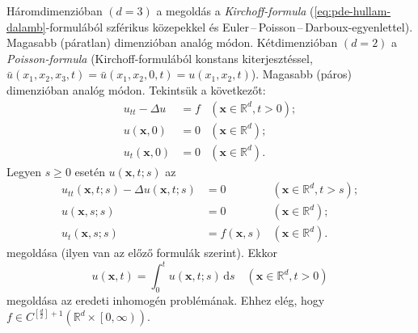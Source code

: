 \documentclass[%
	DIV=15,appendixprefix]{scrreprt}
\theoremstyle{definition}
\theoremstyle{remark}
\begin{document}
Háromdimenzióban $ \left( d = 3 \right) $ a megoldás a \emph{Kirchoff-formula}
(\ref{eq:pde-hullam-dalamb}-formulából szférikus közepekkel és
Euler\,--\,Poisson\,--\,Darboux-egyenlettel). Magasabb (páratlan) dimenzióban analóg módon.
%
Kétdimenzióban $ \left( d = 2 \right) $ a \emph{Poisson-formula} (Kirchoff-formulából konstans
kiterjesztéssel, $ \bar{u} \left( x_{ 1 },{} x_{ 2 },{} x_{ 3 },{} t \right) = \bar{u} \left(
x_{ 1 },{} x_{ 2 },{} 0,{} t \right) = u \left( x_{ 1 },{} x_{ 2 },{} t \right) $). Magasabb (páros) dimenzióban analóg módon.
%
Tekintsük a következőt:
\begin{equation*}
	\begin{aligned}
		u_{ tt } - \Delta u 						&= f 	&
			\left( \mathbf{ x } \in \mathbb{ R }^{ d },{} t > 0 \right);\\
		u \left( \mathbf{ x },{} 0 \right) 			&= 0 	&
			\left( \mathbf{ x } \in \mathbb{ R }^{ d } \right);\\
		u_{ t } \left( \mathbf{ x },{} 0 \right) 	&= 0 	&
			\left( \mathbf{ x } \in \mathbb{ R }^{ d } \right).
	\end{aligned}
\end{equation*}
Legyen $ s \ge 0 $ esetén $ u \left( \mathbf{ x },{} t;{} s \right) $ az
\begin{equation*}
	\begin{aligned}
		u_{ tt } \left( \mathbf{ x },{} t;{} s \right) - \Delta u \left( \mathbf{ x },{} t;{} s \right)											&= 0 									&
			\left( \mathbf{ x } \in \mathbb{ R }^{ d },{} t > s \right);\\
		u \left( \mathbf{ x },{} s;{} s \right) 		&= 0 									&
			\left( \mathbf{ x } \in \mathbb{ R }^{ d } \right);\\
		u_{ t } \left( \mathbf{ x },{} s;{} s \right) 	&= f \left( \mathbf{ x },{} s \right) 	&
			\left( \mathbf{ x } \in \mathbb{ R }^{ d } \right).
	\end{aligned}
\end{equation*}
megoldása (ilyen van az előző formulák szerint). Ekkor
\begin{equation*}
	u \left( \mathbf{ x },{} t \right) = \int_{ 0 }^{ t } u \left( \mathbf{ x },{} t;{} s \right) \,
	\mathrm{ d } s \quad \left( \mathbf{ x } \in \mathbb{ R }^{ d },{} t > 0 \right)
\end{equation*}
megoldása az eredeti inhomogén problémának. Ehhez elég, hogy $ f \in C^{ \left[ \frac{ d }{ 2 } \right] + 1 } \left( \mathbb{ R }^{ d } \times \left.\left[ 0,{} \infty \right)\right. \right) $.
%
\end{document}
